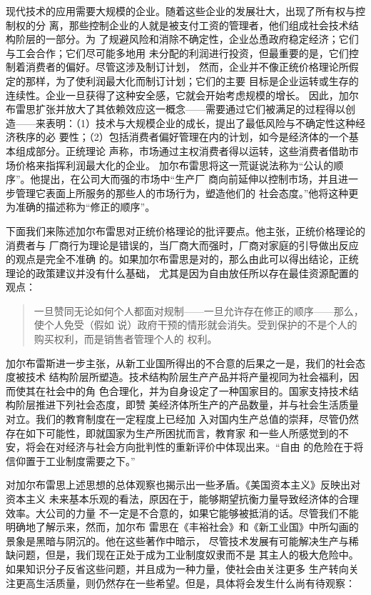 现代技术的应用需要大规模的企业。随着这些企业的发展壮大，出现了所有权与控制权的分
离，那些控制企业的人就是被支付工资的管理者，他们组成社会技术结构阶层的一部分。为
了规避风险和消除不确定性，企业怂恿政府稳定经济；它们与工会合作；它们尽可能多地用
未分配的利润进行投资，但最重要的是，它们控制着消费者的偏好。尽管这涉及制订计划，
然而，企业并不像正统价格理论所假定的那样，为了使利润最大化而制订计划；它们的主要
目标是企业运转或生存的连续性。企业一旦获得了这种安全感，它就会开始考虑规模的增长。
因此，加尔布雷思扩张并放大了其依赖效应这一概念——需要通过它们被满足的过程得以创
造——来表明：（1）技术与大规模企业的成长，提出了最低风险与不确定性这种经济秩序的必
要性；（2）包括消费者偏好管理在内的计划，如今是经济体的一个基本组成部分。正统理论
声称，市场通过主权消费者得以运转，这些消费者借助市场价格来指挥利润最大化的企业。
加尔布雷思将这一荒诞说法称为“公认的顺序”。他提出，在公司大而强的市场中“生产厂
商向前延伸以控制市场，并且进一步管理它表面上所服务的那些人的市场行为，塑造他们的
社会态度。”他将这种更为准确的描述称为“修正的顺序”。

下面我们来陈述加尔布雷思对正统价格理论的批评要点。他主张，正统价格理论的消费者与
厂商行为理论是错误的，当厂商大而强时，厂商对家庭的引导做出反应的观点是完全不准确
的。如果加尔布雷思是对的，那么由此可以得出结论，正统理论的政策建议并没有什么基础，
尤其是因为自由放任所以存在最佳资源配置的观点：
\begin{quotation}
  一旦赞同无论如何个人都面对规制——一旦允许存在修正的顺序——那么，使个人免受（假如
  说）政府干预的情形就会消失。受到保护的不是个人的购买权利，而是销售者管理个人的
  权利。
\end{quotation}

加尔布雷斯进一步主张，从新工业国所得出的不合意的后果之一是，我们的社会态度被技术
结构阶层所塑造。技术结构阶层生产产品并将产量视同为社会福利，因而使其在社会中的角
色合理化，并为自身设定了一种国家目的。国家支持技术结构阶层推进下列社会态度，即赞
美经济体所生产的产品数量，并与社会生活质量对立。我们的教育制度在一定程度上已经加
入对国内生产总值的崇拜，尽管仍然存在如下可能性，即就国家为生产所困扰而言，教育家
和一些人所感觉到的不安，将会在对经济与社会方向批判性的重新评价中体现出来。“自由
的危险在于将信仰置于工业制度需要之下。”

对加尔布雷思上述思想的总体观察也揭示出一些矛盾。《美国资本主义》反映出对资本主义
未来基本乐观的看法，原因在于，能够期望抗衡力量导致经济体的合理效率。大公司的力量
不一定是不合意的，如果它能够被抵消的话。尽管我们不能明确地了解示来，然而，加尔布
雷思在《丰裕社会》和《新工业国》中所勾画的景象是黑暗与阴沉的。他在这些著作中暗示，
尽管技术发展有可能解决生产与稀缺问题，但是，我们现在正处于成为工业制度奴隶而不是
其主人的极大危险中。如果知识分子反省这些问题，并且成为一种力量，使社会由关注更多
生产转向关注更高生活质量，则仍然存在一些希望。但是，具体将会发生什么尚有待观察：

